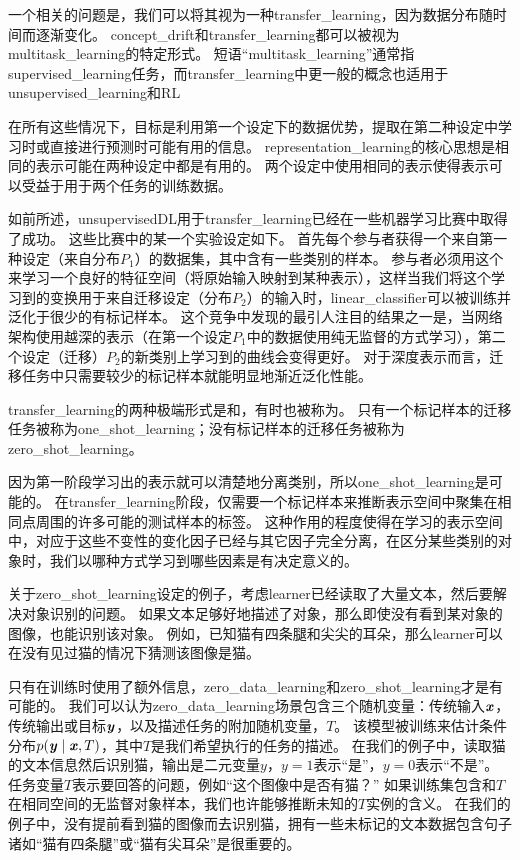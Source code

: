 
一个相关的问题是，我们可以将其视为一种\gls{transfer_learning}，因为数据分布随时间而逐渐变化。
\gls{concept_drift}和\gls{transfer_learning}都可以被视为\gls{multitask_learning}的特定形式。
短语``\gls{multitask_learning}''通常指\gls{supervised_learning}任务，而\gls{transfer_learning}中更一般的概念也适用于\gls{unsupervised_learning}和\gls{RL}

在所有这些情况下，目标是利用第一个设定下的数据优势，提取在第二种设定中学习时或直接进行预测时可能有用的信息。
\gls{representation_learning}的核心思想是相同的表示可能在两种设定中都是有用的。
两个设定中使用相同的表示使得表示可以受益于用于两个任务的训练数据。


如前所述，\gls{unsupervised}\gls{DL}用于\gls{transfer_learning}已经在一些机器学习比赛中取得了成功\citep{UTLC+LISA-2011-small,goodfellow+all-NIPS2011}。
这些比赛中的某一个实验设定如下。
首先每个参与者获得一个来自第一种设定（来自分布$P_1$）的数据集，其中含有一些类别的样本。
参与者必须用这个来学习一个良好的特征空间（将原始输入映射到某种表示），这样当我们将这个学习到的变换用于来自迁移设定（分布$P_2$）的输入时，\gls{linear_classifier}可以被训练并泛化于很少的有标记样本。
这个竞争中发现的最引人注目的结果之一是，当网络架构使用越深的表示（在第一个设定$P_1$中的数据使用纯无监督的方式学习），第二个设定（迁移）$P_2$的新类别上学习到的曲线会变得更好。
对于深度表示而言，迁移任务中只需要较少的标记样本就能明显地渐近泛化性能。


\gls{transfer_learning}的两种极端形式是和，有时也被称为。
只有一个标记样本的迁移任务被称为\gls{one_shot_learning}；没有标记样本的迁移任务被称为\gls{zero_shot_learning}。


因为第一阶段学习出的表示就可以清楚地分离类别，所以\gls{one_shot_learning}\citep{Fei-Fei+al-2006}是可能的。
在\gls{transfer_learning}阶段，仅需要一个标记样本来推断表示空间中聚集在相同点周围的许多可能的测试样本的标签。
这种作用的程度使得在学习的表示空间中，对应于这些不变性的变化因子已经与其它因子完全分离，在区分某些类别的对象时，我们以哪种方式学习到哪些因素是有决定意义的。


关于\gls{zero_shot_learning}设定的例子，考虑\gls{learner}已经读取了大量文本，然后要解决对象识别的问题。
如果文本足够好地描述了对象，那么即使没有看到某对象的图像，也能识别该对象。
例如，已知猫有四条腿和尖尖的耳朵，那么\gls{learner}可以在没有见过猫的情况下猜测该图像是猫。


只有在训练时使用了额外信息，\gls{zero_data_learning}\citep{Larochelle2008}和\gls{zero_shot_learning}\citep{Palatucci2009,Socher-2013}才是有可能的。
我们可以认为\gls{zero_data_learning}场景包含三个随机变量：传统输入$\boldsymbol{\mathit{x}}$，传统输出或目标$\boldsymbol{\mathit{y}}$，以及描述任务的附加随机变量，$T$。
该模型被训练来估计条件分布$p(\boldsymbol{\mathit{y}} \mid \boldsymbol{\mathit{x}}, T)$，其中$T$是我们希望执行的任务的描述。
在我们的例子中，读取猫的文本信息然后识别猫，输出是二元变量$y$，$y=1$表示``是''，$y=0$表示``不是''。
任务变量$T$表示要回答的问题，例如``这个图像中是否有猫？''
如果训练集包含和$T$在相同空间的无监督对象样本，我们也许能够推断未知的$T$实例的含义。
在我们的例子中，没有提前看到猫的图像而去识别猫，拥有一些未标记的文本数据包含句子诸如``猫有四条腿''或``猫有尖耳朵''是很重要的。

